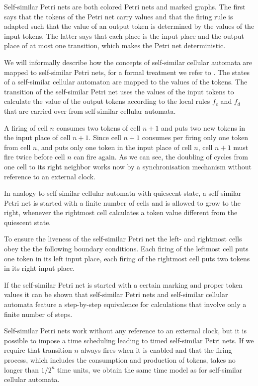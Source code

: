 \documentclass{article}
\theoremstyle{definition}
\begin{document}
Self-similar Petri nets are both colored Petri nets and marked graphs.
The first says that the tokens of the Petri net carry values and that
the firing rule is adapted such that the value of an output token is determined by the values of the input tokens.
The latter says that each place is the input place and the output place of at most one transition, which
makes the Petri net deterministic.

We will informally describe how the concepts of self-similar cellular automata are mapped to self-similar Petri nets,
for a formal treatment we refer to \cite{2008-sica}.
The states of a self-similar cellular automaton are mapped to the values of the tokens.
The transition of the self-similar Petri net uses the values of the input tokens to calculate
the value of the output tokens according to the local rules $f_c$ and $f_d$ that are carried over from self-similar cellular automata.

A firing of cell $n$ consumes two tokens of cell $n+1$ and puts two new tokens in the input place of cell $n+1$.
Since cell $n+1$ consumes per firing only one token from cell $n$, and puts only one token in the input place of cell $n$,
cell $n+1$ must fire twice before cell $n$ can fire again.
As we can see, the doubling of cycles from one cell to its right neighbor works now by a synchronisation mechanism without reference to
an external clock.

In analogy to self-similar cellular automata with quiescent state, a self-similar Petri net
is started with a finite number of cells and is allowed to grow to the right, whenever the rightmost cell
calculates a token value different from the quiescent state.

To ensure the liveness of the self-similar Petri net the left- and rightmost cells 
obey the the following boundary conditions.
Each firing of the leftmost cell puts one token in its left input place, each firing of the rightmost cell 
puts two tokens in its right input place.

If the self-similar Petri net is started with a certain marking and proper token values it can be shown
that self-similar Petri nets and self-similar cellular automata feature a step-by-step equivalence for calculations that
involve only a finite number of steps.

Self-similar Petri nets work without any reference to an external clock, but it is possible to impose a time scheduling
leading to timed self-similar Petri nets.
If we require that transition $n$ always fires when it is enabled and that the firing process, which includes
the consumption and production of tokens, takes no longer than $1/2^n$ time units, we obtain
the same time model as for self-similar cellular automata.
\end{document}
